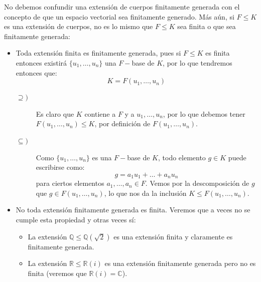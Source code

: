 \begin{observacion}
    No debemos confundir una extensión de cuerpos finitamente generada con el concepto de que un espacio vectorial sea finitamente generado. Más aún, si $F\leq K$ es una extensión de cuerpos, no es lo mismo que $F\leq K$ sea finita o que sea finitamente generada:
    \begin{itemize}
        \item Toda extensión finita es finitamente generada, pues si $F\leq K$ es finita entonces existirá $\{u_1,\ldots,u_n\}$ una $F-$base de $K$, por lo que tendremos entonces que:
            \begin{equation*}
                K = F(u_1,\ldots,u_n)
            \end{equation*}
            \begin{description}
                \item [$\supseteq )$] Es claro que $K$ contiene a $F$ y a $u_1,\ldots,u_n$, por lo que debemos tener $F(u_1,\ldots,u_n)\leq K$, por definición de $F(u_1,\ldots,u_n)$.
                \item [$\subseteq )$] Como $\{u_1,\ldots,u_n\}$ es una $F-$base de $K$, todo elemento $g\in K$ puede escribirse como:
                    \begin{equation*}
                        g = a_1 u_1 + \ldots + a_n u_n
                    \end{equation*}
                    para ciertos elementos $a_1,\ldots,a_n\in F$. Vemos por la descomposición de $g$ que $g\in F(u_1,\ldots,u_n)$, lo que nos da la inclusión $K\leq F(u_1,\ldots,u_n)$.
            \end{description}
        \item No toda extensión finitamente generada es finita. Veremos que a veces no se cumple esta propiedad y otras veces sí:
            \begin{itemize}
                \item La extensión $\mathbb{Q}\leq \mathbb{Q}\left(\sqrt{2}\right)$ es una extensión finita y claramente es finitamente generada.
                \item La extensión $\mathbb{R}\leq \mathbb{R}(i)$ es una extensión finitamente generada pero no es finita (veremos que $\mathbb{R}(i) = \mathbb{C}$).
            \end{itemize}
    \end{itemize}
\end{observacion}

